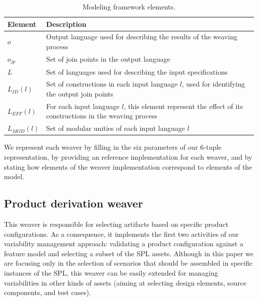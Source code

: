 \documentclass[11pt]{report}
\begin{document}
\begin{table}[h]
\begin{center}
 \caption{Modeling framework elements.} \label{tab:tup-01}
\begin{tabular}{|p{0.6in}|p{2.4in}|}
  \hline
  {\bf Element} & {\bf Description} \\ 
   \hline
  $o$              & Output language used for describing the results of the weaving process \\ \hline
  $o_{jp}$       & Set of join points in the output language \\ \hline
  $L$              & Set of languages used for describing the input specifications \\ \hline
  $L_{ID}(l)$      & Set of constructions in each input language $l$, used for identifying the output join points \\ \hline 
  $L_{EFF}(l)$   & For each input language $l$, this element represent the effect of its constructions in the weaving process \\ \hline
  $L_{MOD}(l)$  & Set of modular unities of each input language $l$\\ \hline
  \hline
\end{tabular}
\end{center}
\end{table}

We represent each weaver by 
filling in the six parameters of our 6-tuple representation, by providing an reference implementation for each 
weaver, and by stating how elements of the weaver implementation correspond to elements of the model.

\subsection{Product derivation weaver}\label{sub:pd-weaver}

This weaver is responsible for selecting artifacts based on specific product configurations. 
As a consequence, it implements the first two activities of our variability management approach: 
validating a product configuration against  a feature model and selecting a subset of the SPL assets. 
Although in this paper we are focusing only in the selection of scenarios that should be assembled in specific instances 
of the SPL, this weaver can be easily extended for managing variabilities in other kinds of assets (aiming at selecting design elements, source components, and test cases). 
\end{document}
